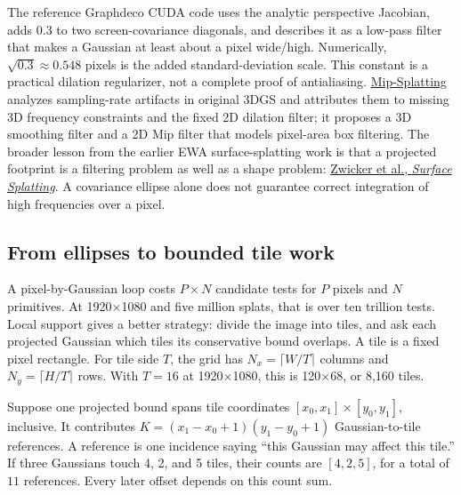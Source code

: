The reference Graphdeco CUDA code uses the analytic perspective Jacobian, adds \(0.3\) to two screen-covariance diagonals, and describes it as a low-pass filter that makes a Gaussian at least about a pixel wide/high. Numerically, \(\sqrt{0.3}\approx0.548\) pixels is the added standard-deviation scale. This constant is a practical dilation regularizer, not a complete proof of antialiasing. \href{https://openaccess.thecvf.com/content/CVPR2024/html/Yu_Mip-Splatting_Alias-free_3D_Gaussian_Splatting_CVPR_2024_paper.html}{Mip-Splatting} analyzes sampling-rate artifacts in original 3DGS and attributes them to missing 3D frequency constraints and the fixed 2D dilation filter; it proposes a 3D smoothing filter and a 2D Mip filter that models pixel-area box filtering. The broader lesson from the earlier EWA surface-splatting work is that a projected footprint is a filtering problem as well as a shape problem: \href{https://www.cs.princeton.edu/courses/archive/spr01/cs598b/papers/zwicker01.pdf}{Zwicker et al., \emph{Surface Splatting}}. A covariance ellipse alone does not guarantee correct integration of high frequencies over a pixel.

\subsection{From ellipses to bounded tile work}\label{04-visual-computing-ii-ch037-from-ellipses-to-bounded-tile-work}

\hypertarget{04-visual-computing-ii-ch037-from-ellipses-to-bounded-tile-work}{}

A pixel-by-Gaussian loop costs \(P\times N\) candidate tests for \(P\) pixels and \(N\) primitives. At 1920×1080 and five million splats, that is over ten trillion tests. Local support gives a better strategy: divide the image into tiles, and ask each projected Gaussian which tiles its conservative bound overlaps. A tile is a fixed pixel rectangle. For tile side \(T\), the grid has \(N_x=\lceil W/T\rceil\) columns and \(N_y=\lceil H/T\rceil\) rows. With \(T=16\) at 1920×1080, this is 120×68, or 8,160 tiles.

Suppose one projected bound spans tile coordinates \([x_0,x_1]\times[y_0,y_1]\), inclusive. It contributes \(K=(x_1-x_0+1)(y_1-y_0+1)\) Gaussian-to-tile references. A reference is one incidence saying ``this Gaussian may affect this tile.'' If three Gaussians touch 4, 2, and 5 tiles, their counts are \([4,2,5]\), for a total of \(11\) references. Every later offset depends on this count sum.

